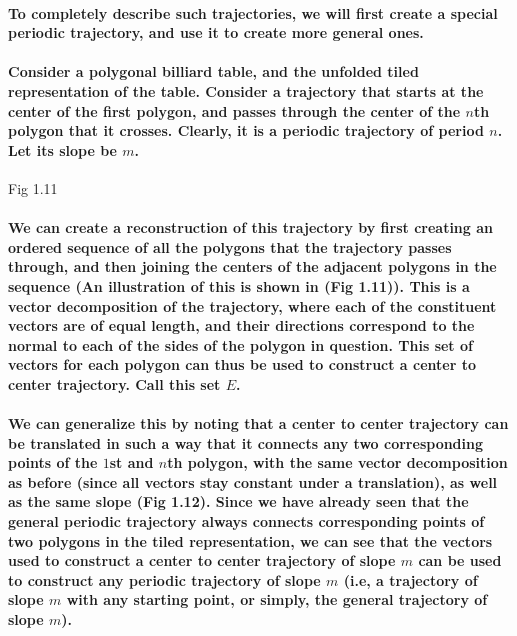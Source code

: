 \documentclass{report}
\begin{document}
\paragraph{To completely describe such trajectories, we will first create a special periodic trajectory, and use it to create more general ones.}

\paragraph{Consider a polygonal billiard table, and the unfolded tiled representation of the table. Consider a trajectory that starts at the center of the first polygon, and passes through the center of the $n$th polygon that it crosses. Clearly, it is a periodic trajectory of period $n$. Let its slope be $m$.}

Fig 1.11

\paragraph{We can create a reconstruction of this trajectory by first creating an ordered sequence of all the polygons that the trajectory passes through, and then joining the centers of the adjacent polygons in the sequence (An illustration of this is shown in (Fig 1.11)). This is a vector decomposition of the trajectory, where each of the constituent vectors are of equal length, and their directions correspond to the normal to each of the sides of the polygon in question. This set of vectors for each polygon can thus be used to construct a center to center trajectory. Call this set $E$.}

\paragraph{We can generalize this by noting that a center to center trajectory can be translated in such a way that it connects any two corresponding points of the $1$st and $n$th polygon, with the same vector decomposition as before (since all vectors stay constant under a translation), as well as the same slope (Fig 1.12). Since we have already seen that the general periodic trajectory always connects corresponding points of two polygons in the tiled representation, we can see that the vectors used to construct a center to center trajectory of slope $m$ can be used to construct any periodic trajectory of slope $m$ (i.e, a trajectory of slope $m$ with any starting point, or simply, the general trajectory of slope $m$).}
\end{document}
